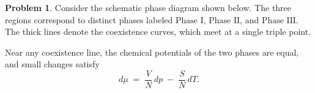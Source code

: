 \documentclass[10pt]{article}
\theoremstyle{definition} %
\newtheorem{problem}{Problem}
\theoremstyle{plain} %
\begin{document}
                                        \begin{problem}
                                          Consider the schematic phase diagram shown below.  
                                          The three regions correspond to distinct phases labeled
                                          \(\text{Phase I}\), \(\text{Phase II}\), and \(\text{Phase III}\).
                                          The thick lines denote the coexistence curves, which meet at a single
                                          triple point.
                                          
                                          \begin{center}
                                          \end{center}
                                          
                                          Near any coexistence line, the chemical potentials of the two phases are
                                          equal, and small changes satisfy
                                          \[
                                            d\mu \;=\; \frac{V}{N}\,dp \;-\; \frac{S}{N}\,dT.
                                          \]
                                          

\end{problem}
\end{document}
